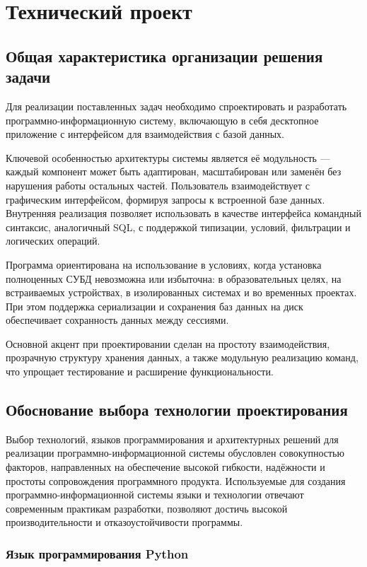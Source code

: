 \section{Технический проект}
\subsection{Общая характеристика организации решения задачи}

Для реализации поставленных задач необходимо спроектировать и разработать программно-информационную систему, включающую в себя десктопное приложение с интерфейсом для взаимодействия с базой данных.

Ключевой особенностью архитектуры системы является её модульность — каждый компонент может быть адаптирован, масштабирован или заменён без нарушения работы остальных частей. Пользователь взаимодействует с графическим интерфейсом, формируя запросы к встроенной базе данных. Внутренняя реализация позволяет использовать в качестве интерфейса командный синтаксис, аналогичный SQL, с поддержкой типизации, условий, фильтрации и логических операций.

Программа ориентирована на использование в условиях, когда установка полноценных СУБД невозможна или избыточна: в образовательных целях, на встраиваемых устройствах, в изолированных системах и во временных проектах. При этом поддержка сериализации и сохранения баз данных на диск обеспечивает сохранность данных между сессиями.

Основной акцент при проектировании сделан на простоту взаимодействия, прозрачную структуру хранения данных, а также модульную реализацию команд, что упрощает тестирование и расширение функциональности.

\subsection{Обоснование выбора технологии проектирования}

Выбор технологий, языков программирования и архитектурных решений для реализации программно-информационной системы обусловлен совокупностью факторов, направленных на обеспечение высокой гибкости, надёжности и простоты сопровождения программного продукта. Используемые для создания программно-информационной системы языки и технологии отвечают современным практикам разработки, позволяют достичь высокой производительности и отказоустойчивости программы.

\subsubsection{Язык программирования Python}

